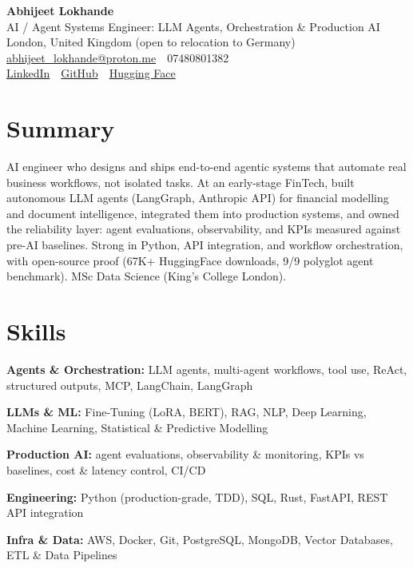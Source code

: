 \documentclass[10pt,a4paper]{article}
\newcommand{\sep}{\,\textcolor{accent!60}{\textbar}\,}
\begin{document}
\begin{center}
  {\fontsize{24}{26}\selectfont\bfseries Abhijeet Lokhande}\\[3pt]
  {\color{accent}\large AI / Agent Systems Engineer: LLM Agents, Orchestration \& Production AI}\\[5pt]
  {\small
    London, United Kingdom (open to relocation to Germany) \sep
    \href{mailto:abhijeet_lokhande@proton.me}{abhijeet\_lokhande@proton.me} \sep
    07480801382 \\[2pt]
    \href{https://www.linkedin.com/in/ablds/}{LinkedIn} \sep
    \href{https://github.com/abhijeetscode}{GitHub} \sep
    \href{https://huggingface.co/ab-ai}{Hugging Face}
  }
\end{center}
\vspace{2pt}

\section{Summary}
AI engineer who designs and ships end-to-end agentic systems that automate real business workflows, not isolated tasks. At an early-stage FinTech, built autonomous LLM agents (LangGraph, Anthropic API) for financial modelling and document intelligence, integrated them into production systems, and owned the reliability layer: agent evaluations, observability, and KPIs measured against pre-AI baselines. Strong in Python, API integration, and workflow orchestration, with open-source proof (67K+ HuggingFace downloads, 9/9 polyglot agent benchmark). MSc Data Science (King's College London).

\section{Skills}
\begin{tight}
  \item[\textcolor{accent}{\small$\bullet$}] \textbf{Agents \& Orchestration:} LLM agents, multi-agent workflows, tool use, ReAct, structured outputs, MCP, LangChain, LangGraph
  \item[\textcolor{accent}{\small$\bullet$}] \textbf{LLMs \& ML:} Fine-Tuning (LoRA, BERT), RAG, NLP, Deep Learning, Machine Learning, Statistical \& Predictive Modelling
  \item[\textcolor{accent}{\small$\bullet$}] \textbf{Production AI:} agent evaluations, observability \& monitoring, KPIs vs baselines, cost \& latency control, CI/CD
  \item[\textcolor{accent}{\small$\bullet$}] \textbf{Engineering:} Python (production-grade, TDD), SQL, Rust, FastAPI, REST API integration
  \item[\textcolor{accent}{\small$\bullet$}] \textbf{Infra \& Data:} AWS, Docker, Git, PostgreSQL, MongoDB, Vector Databases, ETL \& Data Pipelines
\end{tight}
\end{document}

